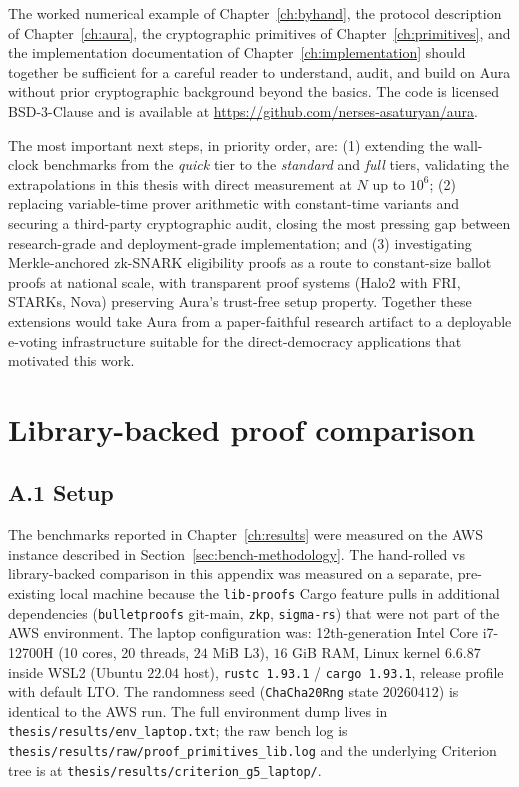 \documentclass[12pt,a4paper,oneside]{report}
\begin{document}
The worked numerical example of Chapter~\ref{ch:byhand}, the 
protocol description of Chapter~\ref{ch:aura}, the cryptographic 
primitives of Chapter~\ref{ch:primitives}, and the implementation 
documentation of Chapter~\ref{ch:implementation} should together be 
sufficient for a careful reader to understand, audit, and build on 
Aura without prior cryptographic background beyond the basics. The 
code is licensed BSD-3-Clause and is available at 
\url{https://github.com/nerses-asaturyan/aura}.

The most important next steps, in priority order, are: (1) extending 
the wall-clock benchmarks from the \emph{quick} tier to the 
\emph{standard} and \emph{full} tiers, validating the extrapolations 
in this thesis with direct measurement at $N$ up to $10^6$; (2) 
replacing variable-time prover arithmetic with constant-time variants 
and securing a third-party cryptographic audit, closing the most 
pressing gap between research-grade and deployment-grade implementation; 
and (3) investigating Merkle-anchored zk-SNARK eligibility proofs as 
a route to constant-size ballot proofs at national scale, with 
transparent proof systems (Halo2 with FRI, STARKs, Nova) preserving 
Aura's trust-free setup property. Together these extensions would 
take Aura from a paper-faithful research artifact to a deployable 
e-voting infrastructure suitable for the direct-democracy applications 
that motivated this work.

\appendix
\chapter{Library-backed proof comparison}
\label{app:lib-comparison}

\section*{A.1 Setup}

The benchmarks reported in Chapter~\ref{ch:results} were measured on the
AWS instance described in Section~\ref{sec:bench-methodology}. The
hand-rolled vs library-backed comparison in this appendix was measured
on a separate, pre-existing local machine because the
\texttt{lib-proofs} Cargo feature pulls in additional dependencies
(\texttt{bulletproofs} git-main, \texttt{zkp}, \texttt{sigma-rs}) that
were not part of the AWS environment. The laptop configuration was:
12th-generation Intel Core i7-12700H (10 cores, 20 threads, $24$ MiB
L3), $16$ GiB RAM, Linux kernel $6.6.87$ inside WSL2 (Ubuntu $22.04$
host), \texttt{rustc 1.93.1} / \texttt{cargo 1.93.1}, release profile
with default LTO. The randomness seed (\texttt{ChaCha20Rng} state
$20260412$) is identical to the AWS run. The full environment dump
lives in \texttt{thesis/results/env\_laptop.txt}; the raw bench log is
\texttt{thesis/results/raw/proof\_primitives\_lib.log} and the
underlying Criterion tree is at
\texttt{thesis/results/criterion\_g5\_laptop/}.
\end{document}

